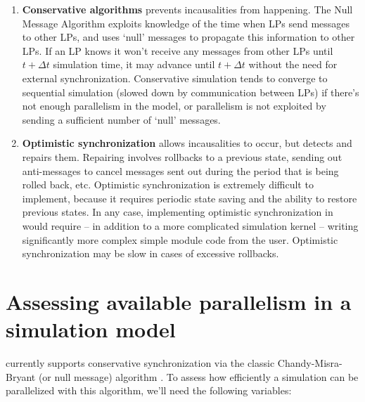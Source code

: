 \begin{enumerate}
  \item{\textbf{Conservative algorithms}
    prevents incausalities from happening. The Null Message Algorithm
    exploits knowledge of the time when LPs send messages to other LPs,
    and uses `null' messages to propagate this information to other LPs.
    If an LP knows it won't receive any messages from other
    LPs until $t+\Delta t$ simulation time, it may advance until
    $t+\Delta t$ without the need for external synchronization.
    Conservative simulation tends to converge to sequential simulation
    (slowed down by communication between LPs) if there's not
    enough parallelism in the model, or parallelism is not exploited
    by sending a sufficient number of `null' messages.}

  \item{\textbf{Optimistic synchronization}
    allows incausalities to occur, but detects and
    repairs them. Repairing involves rollbacks to a previous state,
    sending out anti-messages to cancel messages sent out during the
    period that is being rolled back, etc.  Optimistic synchronization
    is extremely difficult to implement, because it requires periodic
    state saving and the ability to restore previous states. In any
    case, implementing optimistic synchronization in {\opp} would
    require -- in addition to a more complicated simulation kernel --
    writing significantly more complex simple
    module code from the user.  Optimistic synchronization may be slow
    in cases of excessive rollbacks.}
\end{enumerate}


\section{Assessing available parallelism in a simulation model}

{\opp} currently supports conservative synchronization
via the classic Chandy-Misra-Bryant (or null message) algorithm
\cite{chandymisra79}.
To assess how efficiently a simulation can be parallelized
with this algorithm, we'll need the following variables:

